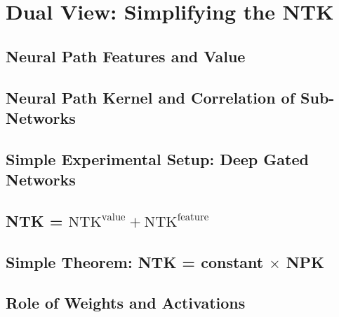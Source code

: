 \section{Dual View: Simplifying the NTK}
\begin{comment}
Rewriting everything in terms of gates.
Simple Theory: Kernel depends on only gates. NTK = NPK

Simple Experiments: Instead of designing another kernel method based on NPK we have 2 choices i) design another kernel ii) use the observation to more simple experiments. that NPK Keep experimenting with various gating patterns.

\end{comment}
\subsection{Neural Path Features and Value}

\subsection{Neural Path Kernel and Correlation of Sub-Networks}

\subsection{Simple Experimental Setup: Deep Gated Networks}

\subsection{NTK = $\text{NTK}^{\text{value}}+ \text{NTK}^\text{feature}$}

\subsection{Simple Theorem: NTK = constant $\times$ NPK}


\subsection{Role of Weights and Activations}

